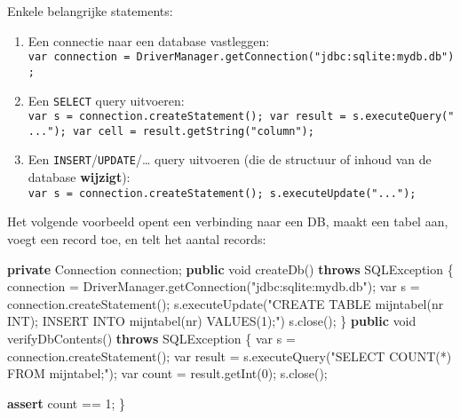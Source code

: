 \documentclass[
]{article}
\newenvironment{Shaded}{}{}
\newcommand{\BuiltInTok}[1]{\textcolor[rgb]{0.00,0.50,0.00}{#1}}
\newcommand{\ControlFlowTok}[1]{\textcolor[rgb]{0.00,0.44,0.13}{\textbf{#1}}}
\newcommand{\DataTypeTok}[1]{\textcolor[rgb]{0.56,0.13,0.00}{#1}}
\newcommand{\DecValTok}[1]{\textcolor[rgb]{0.25,0.63,0.44}{#1}}
\newcommand{\FunctionTok}[1]{\textcolor[rgb]{0.02,0.16,0.49}{#1}}
\newcommand{\KeywordTok}[1]{\textcolor[rgb]{0.00,0.44,0.13}{\textbf{#1}}}
\newcommand{\NormalTok}[1]{#1}
\newcommand{\OperatorTok}[1]{\textcolor[rgb]{0.40,0.40,0.40}{#1}}
\newcommand{\StringTok}[1]{\textcolor[rgb]{0.25,0.44,0.63}{#1}}
\providecommand{\tightlist}{%
  \setlength{\itemsep}{0pt}\setlength{\parskip}{0pt}}
\begin{document}
Enkele belangrijke statements:

\begin{enumerate}
\def\labelenumi{\arabic{enumi}.}
\tightlist
\item
  Een connectie naar een database vastleggen:
  \texttt{var\ connection\ =\ DriverManager.getConnection("jdbc:sqlite:mydb.db");}
\item
  Een \texttt{SELECT} query uitvoeren:
  \texttt{var\ s\ =\ connection.createStatement();\ var\ result\ =\ s.executeQuery("...");\ var\ cell\ =\ result.getString("column");}
\item
  Een \texttt{INSERT}/\texttt{UPDATE}/\ldots{} query uitvoeren (die de
  structuur of inhoud van de database \textbf{wijzigt}):
  \texttt{var\ s\ =\ connection.createStatement();\ s.executeUpdate("...");}
\end{enumerate}

Het volgende voorbeeld opent een verbinding naar een DB, maakt een tabel
aan, voegt een record toe, en telt het aantal records:

\begin{Shaded}
\begin{Highlighting}[]
\KeywordTok{private} \BuiltInTok{Connection}\NormalTok{ connection}\OperatorTok{;}
\KeywordTok{public} \DataTypeTok{void} \FunctionTok{createDb}\OperatorTok{()} \KeywordTok{throws} \BuiltInTok{SQLException} \OperatorTok{\{}
\NormalTok{    connection }\OperatorTok{=} \BuiltInTok{DriverManager}\OperatorTok{.}\FunctionTok{getConnection}\OperatorTok{(}\StringTok{"jdbc:sqlite:mydb.db"}\OperatorTok{);}
    \DataTypeTok{var}\NormalTok{ s }\OperatorTok{=}\NormalTok{ connection}\OperatorTok{.}\FunctionTok{createStatement}\OperatorTok{();}
\NormalTok{    s}\OperatorTok{.}\FunctionTok{executeUpdate}\OperatorTok{(}\StringTok{"CREATE TABLE mijntabel(nr INT); INSERT INTO mijntabel(nr) VALUES(1);"}\OperatorTok{)}
\NormalTok{    s}\OperatorTok{.}\FunctionTok{close}\OperatorTok{();}
\OperatorTok{\}}
\KeywordTok{public} \DataTypeTok{void} \FunctionTok{verifyDbContents}\OperatorTok{()} \KeywordTok{throws} \BuiltInTok{SQLException} \OperatorTok{\{}
    \DataTypeTok{var}\NormalTok{ s }\OperatorTok{=}\NormalTok{ connection}\OperatorTok{.}\FunctionTok{createStatement}\OperatorTok{();}
    \DataTypeTok{var}\NormalTok{ result }\OperatorTok{=}\NormalTok{ s}\OperatorTok{.}\FunctionTok{executeQuery}\OperatorTok{(}\StringTok{"SELECT COUNT(*) FROM mijntabel;"}\OperatorTok{);}
    \DataTypeTok{var}\NormalTok{ count }\OperatorTok{=}\NormalTok{ result}\OperatorTok{.}\FunctionTok{getInt}\OperatorTok{(}\DecValTok{0}\OperatorTok{);}
\NormalTok{    s}\OperatorTok{.}\FunctionTok{close}\OperatorTok{();}

    \ControlFlowTok{assert}\NormalTok{ count }\OperatorTok{==} \DecValTok{1}\OperatorTok{;}
\OperatorTok{\}}
\end{Highlighting}
\end{Shaded}
\end{document}
